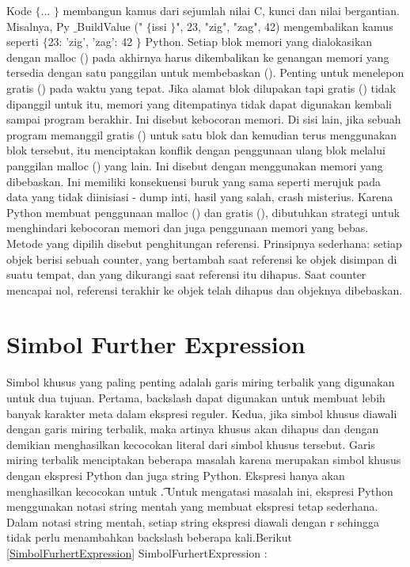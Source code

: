 \vspace{12pt}
Kode  $  \{  $... $  \}  $ membangun kamus dari sejumlah nilai C, kunci dan nilai bergantian. Misalnya, Py $  \_  $BuildValue (" $  \{  $issi $  \}  $", 23, "zig", "zag", 42) mengembalikan kamus seperti  $  \{  $23: 'zig', 'zag': 42 $  \}  $ Python. Setiap blok memori yang dialokasikan dengan malloc () pada akhirnya harus dikembalikan ke genangan memori yang tersedia dengan satu panggilan untuk membebaskan (). Penting untuk menelepon gratis () pada waktu yang tepat. Jika alamat blok dilupakan tapi gratis () tidak dipanggil untuk itu, memori yang ditempatinya tidak dapat digunakan kembali sampai program berakhir. Ini disebut kebocoran memori. Di sisi lain, jika sebuah program memanggil gratis () untuk satu blok dan kemudian terus menggunakan blok tersebut, itu menciptakan konflik dengan penggunaan ulang blok melalui panggilan malloc () yang lain. Ini disebut dengan menggunakan memori yang dibebaskan. Ini memiliki konsekuensi buruk yang sama seperti merujuk pada data yang tidak diinisiasi - dump inti, hasil yang salah, crash misterius. Karena Python membuat penggunaan malloc () dan gratis (), dibutuhkan strategi untuk menghindari kebocoran memori dan juga penggunaan memori yang bebas. Metode yang dipilih disebut penghitungan referensi. Prinsipnya sederhana: setiap objek berisi sebuah counter, yang bertambah saat referensi ke objek disimpan di suatu tempat, dan yang dikurangi saat referensi itu dihapus. Saat counter mencapai nol, referensi terakhir ke objek telah dihapus dan objeknya dibebaskan. 

\section{Simbol Further Expression}
\hspace*{0.5in} Simbol khusus yang paling penting adalah garis miring terbalik yang digunakan untuk dua tujuan. Pertama, backslash dapat digunakan untuk membuat lebih banyak karakter meta dalam ekspresi reguler. Kedua, jika simbol khusus diawali dengan garis miring terbalik, maka artinya khusus akan dihapus dan dengan demikian menghasilkan kecocokan literal dari simbol khusus tersebut.  Garis miring terbalik menciptakan beberapa masalah karena merupakan simbol khusus dengan ekspresi Python dan juga string Python. Ekspresi hanya akan menghasilkan kecocokan untuk \t. Untuk mengatasi masalah ini, ekspresi Python menggunakan notasi string mentah yang membuat ekspresi tetap sederhana. Dalam notasi string mentah, setiap string ekspresi diawali dengan r sehingga tidak perlu menambahkan backslash beberapa kali.Berikut \ref{SimbolFurhertExpression} SimbolFurhertExpression :
\vspace{12pt}

